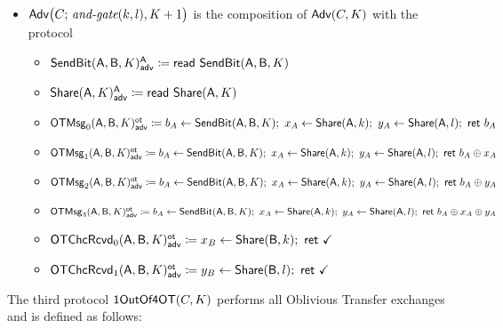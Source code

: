 \begin{itemize}
\item $\mathsf{Adv}\big(C; \, \textit{and-gate}(k,l),K+1\big)$ is the composition of $\mathsf{Adv}(C,K)$ with the protocol
\begin{itemize}
\item {\color{blue} $\mathsf{SendBit}(\mathsf{A},\mathsf{B},K)^{\mathsf{A}}_{\mathsf{adv}} \coloneqq \mathsf{read} \ \mathsf{SendBit}(\mathsf{A},\mathsf{B},K)$}
\item {\color{blue} $\mathsf{Share}(\mathsf{A},K)^{\mathsf{A}}_{\mathsf{adv}} \coloneqq \mathsf{read} \ \mathsf{Share}(\mathsf{A},K)$}\smallskip
\item {\color{blue} $\LeakOTMsg_0(\A,\B,K)^\ot_\adv \coloneqq b_A \leftarrow \SendBit(\A,\B,K); \ x_A \leftarrow \Share(\A,k); \ y_A \leftarrow \Share(\A,l); \ \ret{b_A}$}
\item {\color{blue} $\mathsf{OTMsg}_1(\mathsf{A},\mathsf{B},K)^{\mathsf{ot}}_{\mathsf{adv}} \coloneqq b_A \leftarrow \mathsf{SendBit}(\mathsf{A},\mathsf{B},K); \ x_A \leftarrow \mathsf{Share}(\mathsf{A},k); \ y_A \leftarrow \mathsf{Share}(\mathsf{A},l); \ \mathsf{ret} \ b_A \oplus x_A$}
\item {\color{blue} $\mathsf{OTMsg}_2(\mathsf{A},\mathsf{B},K)^{\mathsf{ot}}_{\mathsf{adv}} \coloneqq b_A \leftarrow \mathsf{SendBit}(\mathsf{A},\mathsf{B},K); \ x_A \leftarrow \mathsf{Share}(\mathsf{A},k); \ y_A \leftarrow \mathsf{Share}(\mathsf{A},l); \ \mathsf{ret} \ b_A \oplus y_A$}
\item {\color{blue} $\mathsf{OTMsg}_3(\mathsf{A},\mathsf{B},K)^{\mathsf{ot}}_{\mathsf{adv}} \coloneqq b_A \leftarrow \mathsf{SendBit}(\mathsf{A},\mathsf{B},K); \ x_A \leftarrow \mathsf{Share}(\mathsf{A},k); \ y_A \leftarrow \mathsf{Share}(\mathsf{A},l); \ \mathsf{ret} \ b_A \oplus x_A \oplus y_A$}\smallskip
\item {\color{blue} $\mathsf{OTChcRcvd}_0(\mathsf{A},\mathsf{B},K)^{\mathsf{ot}}_{\mathsf{adv}} \coloneqq x_B \leftarrow \mathsf{Share}(\mathsf{B},k); \ \mathsf{ret} \ \checkmark$}
\item {\color{blue} $\mathsf{OTChcRcvd}_1(\mathsf{A},\mathsf{B},K)^{\mathsf{ot}}_{\mathsf{adv}} \coloneqq y_B \leftarrow \mathsf{Share}(\mathsf{B},l); \ \mathsf{ret} \ \checkmark$}
\end{itemize}
\end{itemize}

\noindent The third protocol $\mathsf{1OutOf4OT}(C,K)$ performs all Oblivious Transfer exchanges and is defined as follows:

